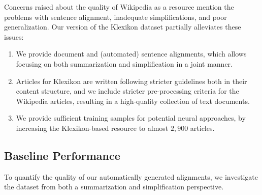 \documentclass[10pt, a4paper]{article}
\begin{document}
Concerns raised about the quality of Wikipedia as a resource \cite{xu-etal-2015-problems} mention the problems with sentence alignment, inadequate simplifications, and poor generalization. Our version of the Klexikon dataset partially alleviates these issues:
\begin{enumerate}
	\item We provide document and (automated) sentence alignments, which allows focusing on both summarization and simplification in a joint manner.
	\item Articles for Klexikon are written following stricter guidelines both in their content structure, and we include stricter pre-processing criteria for the Wikipedia articles, resulting in a high-quality collection of text documents.
	\item We provide sufficient training samples for potential neural approaches, by increasing the Klexikon-based resource to almost $2{,}900$ articles.
\end{enumerate}



\subsection{Baseline Performance}
\label{sec:baseline}
To quantify the quality of our automatically generated alignments, we investigate the dataset from both a summarization and simplification perspective.
\end{document}
